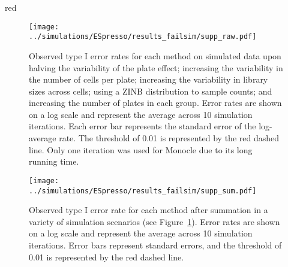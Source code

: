 \documentclass{article}
\begin{document}
\begin{color}{red}
\begin{figure}[p]
    \begin{center}
        \texttt{[image: ../simulations/ESpresso/results\_failsim/supp\_raw.pdf]}
    \end{center}
    \caption{    
        Observed type I error rates for each method on simulated data upon halving the variability of the plate effect; increasing the variability in the number of cells per plate; increasing the variability in library sizes across cells; using a ZINB distribution to sample counts; and increasing the number of plates in each group.
        Error rates are shown on a log scale and represent the average across 10 simulation iterations.
        Each error bar represents the standard error of the log-average rate.
        The threshold of 0.01 is represented by the red dashed line.
        Only one iteration was used for Monocle due to its long running time.
    }
    \label{fig:extrafail}
\end{figure}

\begin{figure}[p]
    \begin{center}
        \texttt{[image: ../simulations/ESpresso/results\_failsim/supp\_sum.pdf]}
    \end{center}
    \caption{   
        Observed type I error rate for each method after summation in a variety of simulation scenarios (see Figure~\ref{fig:extrafail}).
        Error rates are shown on a log scale and represent the average across 10 simulation iterations.
        Error bars represent standard errors, and the threshold of 0.01 is represented by the red dashed line.
    }
\end{figure}


\end{color}
\end{document}
